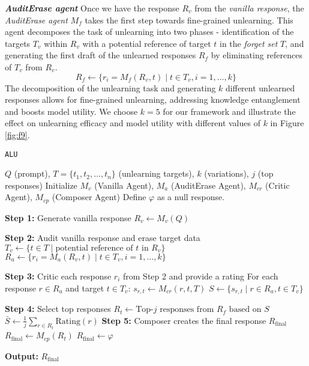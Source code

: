  \textbf{\emph{AuditErase agent}} Once we have the response $R_v$ from the \emph{vanilla response}, the \emph{AuditErase agent} $M_f$ takes the first step towards fine-grained unlearning. This agent decomposes the task of unlearning into two phases - identification of the targets $T_v$ within $R_v$ with a potential reference of target $t$ in the \emph{forget set} $T$, and generating the first draft of the unlearned responses $R_f$ by eliminating references of $T_v$ from $R_v$. $$R_f \gets \{ r_i = M_f(R_v, t) \mid t \in T_v, i = 1, \dots, k \}$$
The decomposition of the unlearning task and generating $k$ different unlearned responses allows for fine-grained unlearning, addressing knowledge entanglement \cite{liu2024largelanguagemodelunlearning} and boosts model utility. We choose $k=5$ for our framework and illustrate the effect on unlearning efficacy and model utility with different values of $k$ in Figure \ref{fig:f9}.

\begin{algorithm}[t]
\caption{\texttt{ALU}}
\label{alg:unlearning-llm}
\begin{algorithmic}[1]
\REQUIRE $Q$ (prompt), $T = \{t_1, t_2, \dots, t_n\}$ (unlearning targets), $k$ (variations), $j$ (top responses)
\STATE Initialize $M_v$ (Vanilla Agent), $M_a$ (AuditErase Agent), $M_{cr}$ (Critic Agent), $M_{cp}$ (Composer Agent)
\STATE Define $\varphi$ as a null response.

\STATE \textbf{Step 1:} Generate vanilla response
\STATE $R_v \gets M_v(Q)$

\STATE \textbf{Step 2:} Audit vanilla response and erase target data
\STATE $T_v \gets \{t \in T \mid \text{potential reference of } t \text{ in } R_v\}$ 
\STATE $R_a \gets \{ r_i = M_a(R_v, t) \mid t \in T_v, i = 1, \dots, k \}$

\STATE \textbf{Step 3:} Critic each response $r_i$ from Step 2 and provide a rating
\STATE For each response $r \in R_a$ and target $t \in T_v$:
\STATE \quad $s_{r,t} \gets M_{cr}(r, t, T)$ 
\STATE $S \gets \{s_{r,t} \mid r \in R_a, t \in T_v\}$ 

\STATE \textbf{Step 4:} Select top responses
\STATE $R_t \gets \text{Top-}j\text{ responses from } R_f \text{ based on } S$
\STATE $\bar{S} \gets \frac{1}{j} \sum_{r \in R_t} \text{Rating}(r)$
\vspace{1mm}
\STATE \textbf{Step 5:} Composer creates the final response $R_{\text{final}}$
\vspace{1mm}
    \STATE $R_{\text{final}} \gets M_{cp}(R_t)$
\ELSE
    \STATE $R_{\text{final}} \gets \varphi$
\ENDIF

\STATE \textbf{Output:} $R_{\text{final}}$
\end{algorithmic}

\end{algorithm}

